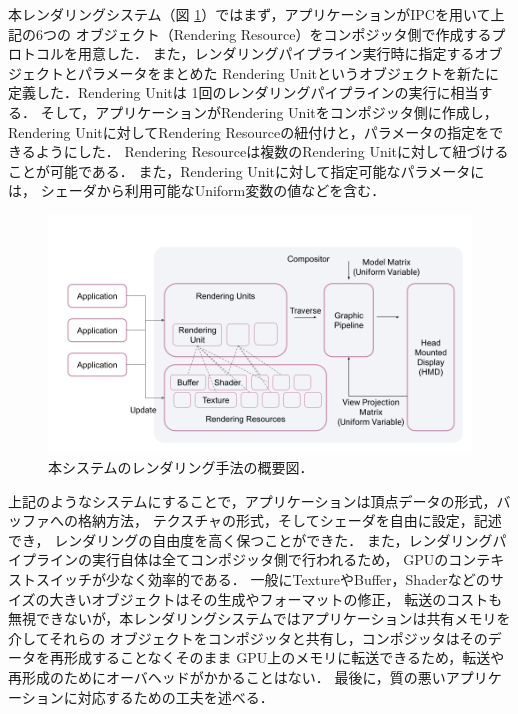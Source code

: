 本レンダリングシステム（図 \ref{fig:rendering}）ではまず，アプリケーションがIPCを用いて上記の6つの
オブジェクト（Rendering Resource）をコンポジッタ側で作成するプロトコルを用意した．
また，レンダリングパイプライン実行時に指定するオブジェクトとパラメータをまとめた
Rendering Unitというオブジェクトを新たに定義した．Rendering Unitは
1回のレンダリングパイプラインの実行に相当する．
そして，アプリケーションがRendering Unitをコンポジッタ側に作成し，
Rendering Unitに対してRendering Resourceの紐付けと，パラメータの指定をできるようにした．
Rendering Resourceは複数のRendering Unitに対して紐づけることが可能である．
また，Rendering Unitに対して指定可能なパラメータには，
シェーダから利用可能なUniform変数の値などを含む．

\begin{figure}[htbp]
  \centering
  \includegraphics[keepaspectratio, width=1\linewidth]{figures/rendering.png}
  \caption{
    本システムのレンダリング手法の概要図．
  }
  \label{fig:rendering}
\end{figure}

上記のようなシステムにすることで，アプリケーションは頂点データの形式，バッファへの格納方法，
テクスチャの形式，そしてシェーダを自由に設定，記述でき，
レンダリングの自由度を高く保つことができた．
また，レンダリングパイプラインの実行自体は全てコンポジッタ側で行われるため，
GPUのコンテキストスイッチが少なく効率的である．
一般にTextureやBuffer，Shaderなどのサイズの大きいオブジェクトはその生成やフォーマットの修正，
転送のコストも無視できないが，本レンダリングシステムではアプリケーションは共有メモリを介してそれらの
オブジェクトをコンポジッタと共有し，コンポジッタはそのデータを再形成することなくそのまま
GPU上のメモリに転送できるため，転送や再形成のためにオーバヘッドがかかることはない．
最後に，質の悪いアプリケーションに対応するための工夫を述べる．

